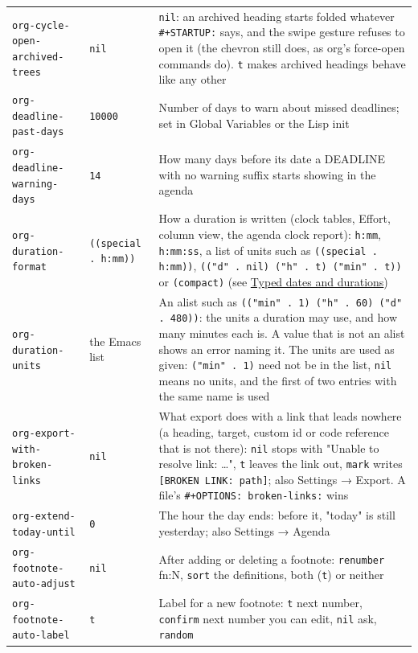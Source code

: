 \documentclass[11pt]{article}
\begin{document}
\begin{center}
\begin{tabular}{lll}
\texttt{org-cycle-open-archived-trees} & \texttt{nil} & \texttt{nil}: an archived heading starts folded whatever \texttt{\#+STARTUP:} says, and the swipe gesture refuses to open it (the chevron still does, as org's force-open commands do). \texttt{t} makes archived headings behave like any other\\[0pt]
\texttt{org-deadline-past-days} & \texttt{10000} & Number of days to warn about missed deadlines; set in Global Variables or the Lisp init\\[0pt]
\texttt{org-deadline-warning-days} & \texttt{14} & How many days before its date a DEADLINE with no warning suffix starts showing in the agenda\\[0pt]
\texttt{org-duration-format} & \texttt{((special . h:mm))} & How a duration is written (clock tables, Effort, column view, the agenda clock report): \texttt{h:mm}, \texttt{h:mm:ss}, a list of units such as \texttt{((special . h:mm))}, \texttt{(("d" . nil) ("h" . t) ("min" . t))} or \texttt{(compact)} (see \hyperref[sec:org14be048]{Typed dates and durations})\\[0pt]
\texttt{org-duration-units} & the Emacs list & An alist such as \texttt{(("min" . 1) ("h" . 60) ("d" . 480))}: the units a duration may use, and how many minutes each is. A value that is not an alist shows an error naming it. The units are used as given: \texttt{("min" . 1)} need not be in the list, \texttt{nil} means no units, and the first of two entries with the same name is used\\[0pt]
\texttt{org-export-with-broken-links} & \texttt{nil} & What export does with a link that leads nowhere (a heading, target, custom id or code reference that is not there): \texttt{nil} stops with "Unable to resolve link: …", \texttt{t} leaves the link out, \texttt{mark} writes \texttt{[BROKEN LINK: path]}; also Settings → Export. A file's \texttt{\#+OPTIONS: broken-links:} wins\\[0pt]
\texttt{org-extend-today-until} & \texttt{0} & The hour the day ends: before it, "today" is still yesterday; also Settings → Agenda\\[0pt]
\texttt{org-footnote-auto-adjust} & \texttt{nil} & After adding or deleting a footnote: \texttt{renumber} fn:N, \texttt{sort} the definitions, both (\texttt{t}) or neither\\[0pt]
\texttt{org-footnote-auto-label} & \texttt{t} & Label for a new footnote: \texttt{t} next number, \texttt{confirm} next number you can edit, \texttt{nil} ask, \texttt{random}\\[0pt]

\end{tabular}
\end{center}
\end{document}
